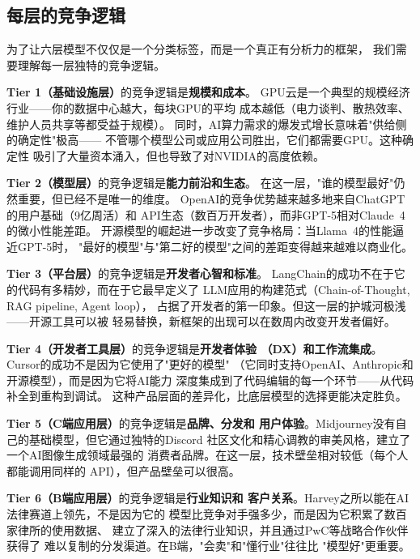 \subsection{每层的竞争逻辑}

为了让六层模型不仅仅是一个分类标签，而是一个真正有分析力的框架，
我们需要理解每一层独特的竞争逻辑。

\textbf{Tier 1（基础设施层）}的竞争逻辑是\textbf{规模和成本}。
GPU云是一个典型的规模经济行业——你的数据中心越大，每块GPU的平均
成本越低（电力谈判、散热效率、维护人员共享等都受益于规模）。
同时，AI算力需求的爆发式增长意味着"供给侧的确定性"极高——
不管哪个模型公司或应用公司胜出，它们都需要GPU。这种确定性
吸引了大量资本涌入，但也导致了对NVIDIA的高度依赖。

\textbf{Tier 2（模型层）}的竞争逻辑是\textbf{能力前沿和生态}。
在这一层，"谁的模型最好"仍然重要，但已经不是唯一的维度。
OpenAI的竞争优势越来越多地来自ChatGPT的用户基础（9亿周活）和
API生态（数百万开发者），而非GPT-5相对Claude~4的微小性能差距。
开源模型的崛起进一步改变了竞争格局：当Llama~4的性能逼近GPT-5时，
"最好的模型"与"第二好的模型"之间的差距变得越来越难以商业化。

\textbf{Tier 3（平台层）}的竞争逻辑是\textbf{开发者心智和标准}。
LangChain的成功不在于它的代码有多精妙，而在于它最早定义了
LLM应用的构建范式（Chain-of-Thought, RAG pipeline, Agent loop），
占据了开发者的第一印象。但这一层的护城河极浅——开源工具可以被
轻易替换，新框架的出现可以在数周内改变开发者偏好。

\textbf{Tier 4（开发者工具层）}的竞争逻辑是\textbf{开发者体验
（DX）和工作流集成}。Cursor的成功不是因为它使用了"更好的模型"
（它同时支持OpenAI、Anthropic和开源模型），而是因为它将AI能力
深度集成到了代码编辑的每一个环节——从代码补全到重构到调试。
这种产品层面的差异化，比底层模型的选择更能决定胜负。

\textbf{Tier 5（C端应用层）}的竞争逻辑是\textbf{品牌、分发和
用户体验}。Midjourney没有自己的基础模型，但它通过独特的Discord
社区文化和精心调教的审美风格，建立了一个AI图像生成领域最强的
消费者品牌。在这一层，技术壁垒相对较低（每个人都能调用同样的
API），但产品壁垒可以很高。

\textbf{Tier 6（B端应用层）}的竞争逻辑是\textbf{行业知识和
客户关系}。Harvey之所以能在AI法律赛道上领先，不是因为它的
模型比竞争对手强多少，而是因为它积累了数百家律所的使用数据、
建立了深入的法律行业知识，并且通过PwC等战略合作伙伴获得了
难以复制的分发渠道。在B端，"会卖"和"懂行业"往往比
"模型好"更重要。

